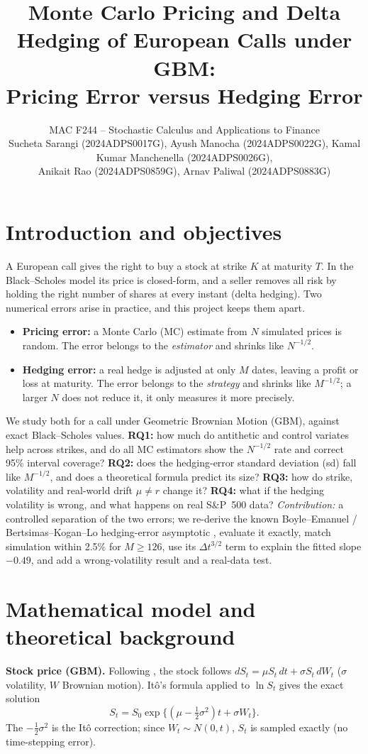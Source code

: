 \documentclass[10pt,a4paper]{article}
\title{\large\bfseries Monte Carlo Pricing and Delta Hedging of European Calls under GBM:\\ Pricing Error versus Hedging Error}
\author{MAC F244 -- Stochastic Calculus and Applications to Finance \\
\small Sucheta Sarangi (2024ADPS0017G), Ayush Manocha (2024ADPS0022G), Kamal Kumar Manchenella (2024ADPS0026G),\\ \small Anikait Rao (2024ADPS0859G), Arnav Paliwal (2024ADPS0883G)}
\date{}
\begin{document}
\maketitle

\section{Introduction and objectives}
A European call gives the right to buy a stock at strike $K$ at maturity $T$. In the Black--Scholes model \cite{bs} its price is closed-form, and a seller removes all risk by holding the right number of shares at every instant (delta hedging). Two numerical errors arise in practice, and this project keeps them apart.
\begin{itemize}
\item \textbf{Pricing error:} a Monte Carlo (MC) estimate from $N$ simulated prices is random. The error belongs to the \emph{estimator} and shrinks like $N^{-1/2}$.
\item \textbf{Hedging error:} a real hedge is adjusted at only $M$ dates, leaving a profit or loss at maturity. The error belongs to the \emph{strategy} and shrinks like $M^{-1/2}$; a larger $N$ does not reduce it, it only measures it more precisely.
\end{itemize}
We study both for a call under Geometric Brownian Motion (GBM), against exact Black--Scholes values. \textbf{RQ1:} how much do antithetic and control variates help across strikes, and do all MC estimators show the $N^{-1/2}$ rate and correct 95\% interval coverage? \textbf{RQ2:} does the hedging-error standard deviation (sd) fall like $M^{-1/2}$, and does a theoretical formula predict its size? \textbf{RQ3:} how do strike, volatility and real-world drift $\mu\neq r$ change it? \textbf{RQ4:} what if the hedging volatility is wrong, and what happens on real S\&P~500 data? \emph{Contribution:} a controlled separation of the two errors; we re-derive the known Boyle--Emanuel / Bertsimas--Kogan--Lo hedging-error asymptotic \cite{be,bkl}, evaluate it exactly, match simulation within 2.5\% for $M\ge126$, use its $\Delta t^{3/2}$ term to explain the fitted slope $-0.49$, and add a wrong-volatility result and a real-data test.

\section{Mathematical model and theoretical background}
\textbf{Stock price (GBM).} Following \cite{sh}, the stock follows $dS_t=\mu S_t\,dt+\sigma S_t\,dW_t$ ($\sigma$ volatility, $W$ Brownian motion). It\^o's formula applied to $\ln S_t$ gives the exact solution
\begin{equation}S_t=S_0\exp\{(\mu-\tfrac12\sigma^2)t+\sigma W_t\}.\end{equation}
The $-\frac12\sigma^2$ is the It\^o correction; since $W_t\sim N(0,t)$, $S_t$ is sampled exactly (no time-stepping error).
\end{document}

